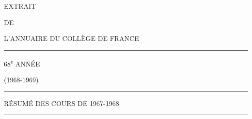 \begin{center}
{\Large EXTRAIT}

DE

L’ANNUAIRE DU COLLÈGE DE FRANCE

\rule{1.2cm}{0.4pt}

68\textsuperscript{e} ANNÉE

(1968-1969)

\rule{1.2cm}{0.4pt}

{\large RÉSUMÉ DES COURS DE 1967-1968}

\rule{1.8cm}{0.4pt}
\end{center}
